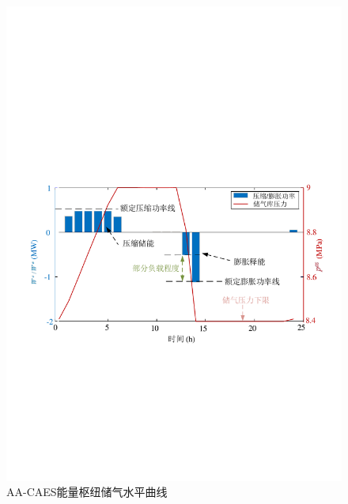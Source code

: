 \begin{figure}[H]
\centering
\includegraphics[scale=0.66]{figures/Chap4-15-Hub-Dispatch-Exe-ASU-SOC-V2.pdf}
\caption{AA-CAES能量枢纽储气水平曲线}
\label{Fig:Hub-Dispatch-Exe-ASU-SOC}
\end{figure}

